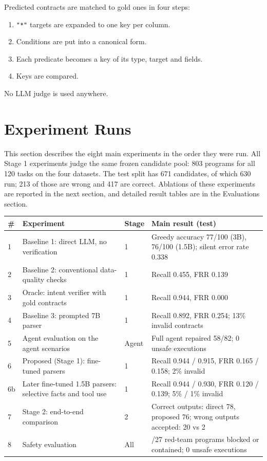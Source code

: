 \documentclass[11pt]{article}
\providecommand{\tightlist}{\setlength{\itemsep}{0pt}\setlength{\parskip}{0pt}}
\begin{document}
Predicted contracts are matched to gold ones in four steps:

\begin{enumerate}
\def\labelenumi{\arabic{enumi}.}
\tightlist
\item
  \texttt{"*"} targets are expanded to one key per column.
\item
  Conditions are put into a canonical form.
\item
  Each predicate becomes a key of its type, target and fields.
\item
  Keys are compared.
\end{enumerate}

No LLM judge is used anywhere.

\section{Experiment Runs}

This section describes the eight main experiments in the order they were
run. All Stage 1 experiments judge the same frozen candidate pool: 803
programs for all 120 tasks on the four datasets. The test split has 671
candidates, of which 630 run; 213 of those are wrong and 417 are
correct. Ablations of these experiments are reported in the next
section, and detailed result tables are in the Evaluations section.

\begin{table}[!tp]
\centering\footnotesize\setlength{\tabcolsep}{3pt}\renewcommand{\arraystretch}{1.1}
\begin{tabularx}{\textwidth}{l>{\raggedright\arraybackslash}Xl>{\raggedright\arraybackslash}X}
\toprule
\textbf{\#} & \textbf{Experiment} & \textbf{Stage} & \textbf{Main result (test)} \\
\midrule
1 & Baseline 1: direct LLM, no verification & 1 & Greedy accuracy 77/100 (3B), 76/100 (1.5B); silent error rate 0.338 \\
2 & Baseline 2: conventional data-quality checks & 1 & Recall 0.455, FRR 0.139 \\
3 & Oracle: intent verifier with gold contracts & 1 & Recall 0.944, FRR 0.000 \\
4 & Baseline 3: prompted 7B parser & 1 & Recall 0.892, FRR 0.254; 13\% invalid contracts \\
5 & Agent evaluation on the agent scenarios & Agent & Full agent repaired 58/82; 0 unsafe executions \\
6 & Proposed (Stage 1): fine-tuned parsers & 1 & Recall 0.944 / 0.915, FRR 0.165 / 0.158; 2\% invalid \\
6b & Later fine-tuned 1.5B parsers: selective facts and tool use & 1 & Recall 0.944 / 0.930, FRR 0.120 / 0.139; 5\% / 1\% invalid \\
7 & Stage 2: end-to-end comparison & 2 & Correct outputs: direct 78, proposed 76; wrong outputs accepted: 20 vs 2 \\
8 & Safety evaluation & All & 27/27 red-team programs blocked or contained; 0 unsafe executions \\
\bottomrule
\end{tabularx}
\end{table}
\end{document}

